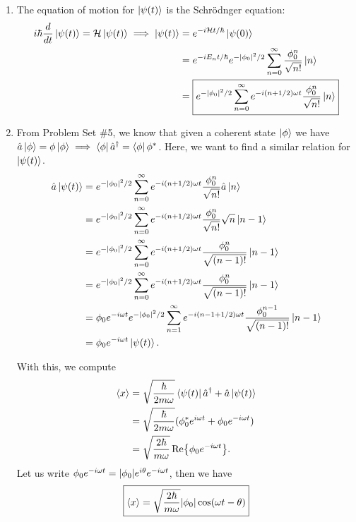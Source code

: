 \documentclass{article}
\theoremstyle{definition}
\newcommand{\ham}{\mathcal{H}}
\newcommand{\f}[2]{\frac{#1}{#2}}
\begin{document}
\begin{enumerate}[label=(\alph*)]
	\item The equation of motion for $\ket{\psi(t)}$ is the Schr\"{o}dnger equation:
	\begin{align*}
	i\hbar \f{d}{dt}\ket{\psi(t)} = \ham \ket{\psi(t)} \implies \ket{\psi(t)} &= e^{-i\ham t/\hbar}\ket{\psi(0)} \\
	&= e^{-iE_n t/\hbar}e^{-\abs{\phi_0}^2/2}\sum_{n=0}^\infty \f{\phi_0^n}{\sqrt{n!}}\ket{n}\\
	&= \boxed{{e^{-\abs{\phi_0}^2/2}\sum_{n=0}^\infty e^{-i (n+1/2) \omega t}\f{\phi_0^n}{\sqrt{n!}}\ket{n}}}
	\end{align*}
	
	\item From Problem Set \#5, we know that given a coherent state $\ket{\phi}$ we have $\hat a \ket{\phi} = \phi \ket{\phi} \implies \bra{\phi}\hat a^\dagger = \bra{\phi}\phi^*$. Here, we want to find a similar relation for $\ket{\psi(t)}$. 
	\begin{align*}
	\hat a \ket{\psi(t)} &= {{e^{-\abs{\phi_0}^2/2}\sum_{n=0}^\infty e^{-i (n+1/2) \omega t}\f{\phi_0^n}{\sqrt{n!}}\hat a\ket{n}}}\\
	&= {{e^{-\abs{\phi_0}^2/2}\sum_{n=0}^\infty e^{-i (n+1/2) \omega t}\f{\phi_0^n}{\sqrt{n!}} \sqrt{n} \ket{n-1}}}\\
	&= {{e^{-\abs{\phi_0}^2/2}\sum_{n=0}^\infty e^{-i (n+1/2) \omega t}\f{\phi_0^{n}}{\sqrt{(n-1)!}} \ket{n-1}}}\\
	&= {{e^{-\abs{\phi_0}^2/2}\sum_{n=0}^\infty e^{-i (n+1/2) \omega t}\f{\phi_0^{n}}{\sqrt{(n-1)!}} \ket{n-1}}}\\
	&= \phi_0 e^{-i\omega t}e^{-\abs{\phi_0}^2/2}\sum_{n=1}^\infty e^{-i (n-1+1/2) \omega t}\f{\phi_0^{n-1}}{\sqrt{(n-1)!}} \ket{n-1} \\
	&= \phi_0 e^{-i\omega t}\ket{\psi(t)}.
	\end{align*}
	
	
	
	With this, we compute 
	\begin{align*}
	\langle x \rangle &= \sqrt{\f{\hbar}{2m\omega}} \bra{\psi(t)} \hat a^\dagger + \hat a \ket{\psi(t)}\\
	&= \sqrt{\f{\hbar}{2m\omega}} (\phi_0^* e^{i\omega t} + \phi_0 e^{-i\omega t})\\ 
	&= \sqrt{\f{2\hbar}{m\omega}}  \Re{\phi_0 e^{-i\omega t}}.
	\end{align*}
	Let us write $\phi_0 e^{-i\omega t} = \abs{\phi_0} e^{i\theta}e^{-i\omega t}$, then we have
	\begin{align*}
	\boxed{\langle x\rangle = \sqrt{\f{2\hbar}{m\omega}}\abs{\phi_0}\cos(\omega t- \theta)}
	\end{align*}
	

\end{enumerate}
\end{document}
